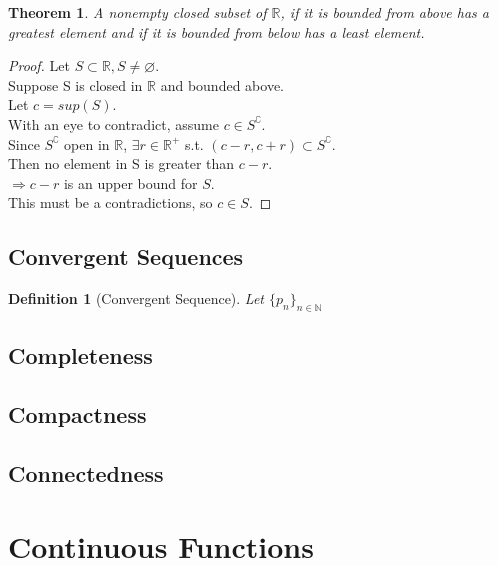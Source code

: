 \documentclass{article}
\newtheorem{definition}{Definition}[section]
\newtheorem{theorem}{Theorem}[section]
\begin{document}
			\begin{theorem}
				A nonempty closed subset of $\mathbb{R}$, if it is bounded from above has a greatest element
				and if it is bounded from below has a least element.
			\end{theorem}
			\begin{proof}
				Let $S \subset \mathbb{R}, S \neq \varnothing$.\\
				Suppose S is closed in $\mathbb{R}$ and bounded above.\\
				Let $c = sup(S)$.\\
				With an eye to contradict, assume $c \in S^\complement$.\\
				Since $S^\complement$ open in $\mathbb{R}$, $\exists r \in \mathbb{R}^+$ s.t. $(c-r, c+r) \subset S^\complement$.\\
				Then no element in S is greater than $c - r$.\\
				$\Rightarrow c - r$ is an upper bound for $S$.\\
				This must be a contradictions, so $c \in S$.
			\end{proof}

		\subsection{Convergent Sequences}

			\begin{definition}[Convergent Sequence]
				\label{convergent sequence}
				Let $\{ p_n \}_{n \in \mathbb{N}}$
				
			\end{definition}
		
		\subsection{Completeness}
		
		\subsection{Compactness}
		
		\subsection{Connectedness}
	
	\section{Continuous Functions}
\end{document}
